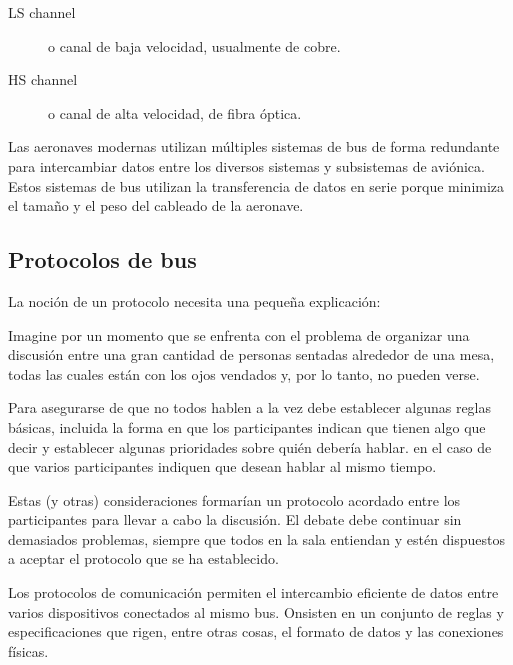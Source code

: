 \begin{description}
\item[LS channel] o canal de baja velocidad, usualmente de cobre.
\item[HS channel] o canal de alta velocidad, de fibra óptica.
\end{description}


\begin{tcolorbox}
  Las aeronaves modernas utilizan múltiples sistemas de bus de forma
  redundante para intercambiar datos entre los diversos sistemas y
  subsistemas de aviónica. Estos sistemas de bus utilizan la
  transferencia de datos en serie porque minimiza el tamaño y el peso
  del cableado de la aeronave.
\end{tcolorbox}

\subsection{Protocolos de bus}
\label{sec:01.05.01.02.protocolos.bus}


La noción de un protocolo necesita una pequeña explicación:

Imagine por un momento que se enfrenta con el problema de organizar una discusión entre una gran cantidad de personas sentadas alrededor de una mesa, todas las cuales están con los ojos vendados y, por lo tanto, no pueden verse.

Para asegurarse de que no todos hablen a la vez debe establecer algunas reglas básicas, incluida la forma en que los participantes indican que tienen algo que decir y establecer algunas prioridades sobre quién debería hablar. en el caso de que varios participantes indiquen que desean hablar al mismo tiempo.

Estas (y otras) consideraciones formarían un protocolo acordado entre los participantes para llevar a cabo la discusión. El debate debe continuar sin demasiados problemas, siempre que todos en la sala entiendan y estén dispuestos a aceptar el protocolo que se ha establecido. 


Los protocolos de comunicación permiten el intercambio eficiente de datos entre varios dispositivos conectados al mismo bus. Onsisten en un conjunto de reglas y especificaciones que rigen, entre otras cosas, el formato de datos y las conexiones físicas.



